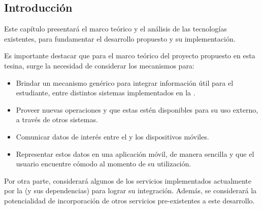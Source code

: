 \subsection{Introducción}
\label{analisis_servicios_introduccion}

Este capítulo presentará el marco teórico y el análisis de las tecnologías existentes, para fundamentar el desarrollo propuesto y su implementación.

Es importante destacar que para el marco teórico del proyecto propuesto en esta tesina, surge la necesidad de considerar los mecanismos para:
\begin{itemize}
\item Brindar un mecanismo genérico para integrar información útil para el estudiante, entre distintos sistemas implementados en la \unlp{}.
\item Proveer nuevas operaciones y que estas estén disponibles para su uso externo, a través de otros sistemas.
\item Comunicar datos de interés entre el  y los dispositivos móviles.
\item Representar estos datos en una aplicación móvil, de manera sencilla y que el usuario encuentre cómodo al momento de su utilización.
\end{itemize}

Por otra parte, considerará algunos de los servicios implementados actualmente por la \unlp{} (y sus dependencias) para lograr su integración. Además, se considerará la potencialidad de incorporación de otros servicios pre-existentes a este desarrollo.

